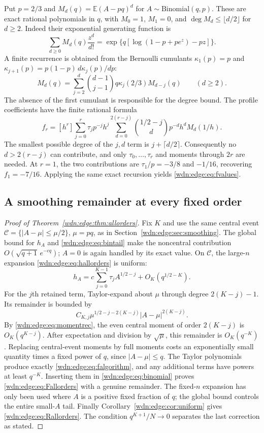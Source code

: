 \documentclass[11pt,letterpaper]{article}
\theoremstyle{remark}\newtheorem{remark}[theorem]{Remark}
\newcommand{\E}{\mathbb E}
\begin{document}
Put $p=2/3$ and $M_d(q)=\E(A-pq)^d$ for $A\sim\mathrm{Binomial}(q,p)$.
These are exact rational polynomials in $q$, with
$M_0=1$, $M_1=0$, and $\deg M_d\le\lfloor d/2\rfloor$ for $d\ge2$.
Indeed their exponential generating function is
\[
 \sum_{d\ge0}M_d(q)\frac{z^d}{d!}
 =\exp\{q[\log(1-p+pe^z)-pz]\}.
\]
A finite recurrence is obtained from the Bernoulli cumulants
$\kappa_1(p)=p$ and
$\kappa_{j+1}(p)=p(1-p)\,d\kappa_j(p)/dp$:
\begin{equation}\label{wdn:edge:eq:momentrec}
 M_d(q)=\sum_{j=2}^d\binom{d-1}{j-1}q\kappa_j(2/3)M_{d-j}(q)
 \qquad(d\ge2).
\end{equation}
The absence of the first cumulant is responsible for the degree bound.
The profile coefficients have the finite rational formula
\begin{equation}\label{wdn:edge:eq:falgorithm}
 f_r=[h^r]\sum_{j=0}^{r}\tau_jp^{-j}h^j
       \sum_{d=0}^{2(r-j)}\binom{1/2-j}{d}p^{-d}h^dM_d(1/h).
\end{equation}
The smallest possible degree of the $j,d$ term is
$j+\lceil d/2\rceil$. Consequently no $d>2(r-j)$ can contribute,
and only $\tau_0,\ldots,\tau_r$ and moments through $2r$ are needed.
At $r=1$, the two contributions are $\tau_1/p=-3/8$ and $-1/16$,
recovering $f_1=-7/16$. Applying the same exact recursion yields
\eqref{wdn:edge:eq:fvalues}.

\subsection{A smoothing remainder at every fixed order}
\begin{proof}[Proof of Theorem~\ref{wdn:edge:thm:allorders}]
Fix $K$ and use the same central event
$\mathcal C=\{|A-\mu|\le\mu/2\}$, $\mu=pq$, as in
Section~\ref{wdn:edge:sec:smoothing}. The global bound for $h_A$ and
\eqref{wdn:edge:eq:bintail} make the noncentral contribution
$O(\sqrt{q+1}\,e^{-cq})$; $A=0$ is again handled by its exact value.
On $\mathcal C$, the large-$n$ expansion \eqref{wdn:edge:eq:hallorders} is uniform:
\[
 h_A=c\sum_{j=0}^{K-1}\tau_j A^{1/2-j}+O_K(q^{1/2-K}).
\]
For the $j$th retained term, Taylor-expand about $\mu$ through degree
$2(K-j)-1$. Its remainder is bounded by
\[
 C_{K,j}\mu^{1/2-j-2(K-j)}|A-\mu|^{2(K-j)}.
\]
By \eqref{wdn:edge:eq:momentrec}, the even central moment of order $2(K-j)$
is $O_K(q^{K-j})$. After expectation and division by $\sqrt\mu$, this
remainder is $O_K(q^{-K})$. Replacing central-event moments by full
moments costs an exponentially small quantity times a fixed power of
$q$, since $|A-\mu|\le q$. The Taylor polynomials produce exactly
\eqref{wdn:edge:eq:falgorithm}, and any additional terms have powers at least
$q^{-K}$. Inserting them in \eqref{wdn:edge:eq:binomial} proves
\eqref{wdn:edge:eq:Fallorders} with a genuine remainder. The fixed-$n$ expansion
has only been used where $A$ is a positive fixed fraction of $q$;
the global bound controls the entire small-$A$ tail.
Finally Corollary~\ref{wdn:edge:cor:uniform} gives \eqref{wdn:edge:eq:Rallorders}.
The condition $q^{K+1}/N\to0$ separates the last correction as stated.
\end{proof}
\end{document}

